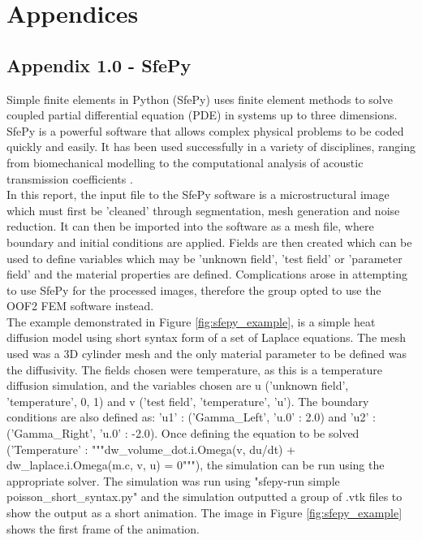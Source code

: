 \documentclass[\report.tex]{subfiles}
\begin{document}
\section{Appendices}

\subsection{Appendix 1.0 - SfePy}
Simple finite elements in Python (SfePy) uses finite element methods to solve coupled partial differential equation (PDE) in systems up to three dimensions. SfePy is a powerful software that allows complex physical problems to be coded quickly and easily. It has been used successfully in a variety of disciplines, ranging from biomechanical modelling \cite{biomedapplication} to the computational analysis of acoustic transmission coefficients \cite{AcousticTransmission}.\\

\noindent In this report, the input file to the SfePy software is a microstructural image which must first be 'cleaned' through segmentation, mesh generation and noise reduction. It can then be imported into the software as a mesh file, where boundary and initial conditions are applied. Fields are then created which can be used to define variables which may be 'unknown field', 'test field' or 'parameter field' \cite{FEMinSfePy} and the material properties are defined. Complications arose in attempting to use SfePy for the processed images, therefore the group opted to use the OOF2 FEM software instead.\\

\noindent The example demonstrated in Figure \ref{fig:sfepy_example}, is a simple heat diffusion model using short syntax form of a set of Laplace equations. The mesh used was a 3D cylinder mesh and the only material parameter to be defined was the diffusivity. The fields chosen were temperature, as this is a temperature diffusion simulation, and the variables chosen are u ('unknown field', 'temperature', 0, 1) and v ('test field',    'temperature', 'u'). The boundary conditions are also defined as: 'u1' : ('Gamma\_Left', {'u.0' : 2.0}) and 'u2' : ('Gamma\_Right', {'u.0' : -2.0}). Once defining the equation to be solved ('Temperature' : """dw\_volume\_dot.i.Omega(v, du/dt) + dw\_laplace.i.Omega(m.c, v, u) = 0"""), the simulation can be run using the appropriate solver. The simulation was run using "sfepy-run simple poisson\_short\_syntax.py" and the simulation outputted a group of .vtk files to show the output as a short animation. The image in Figure \ref{fig:sfepy_example} shows the first frame of the animation.
\end{document}
